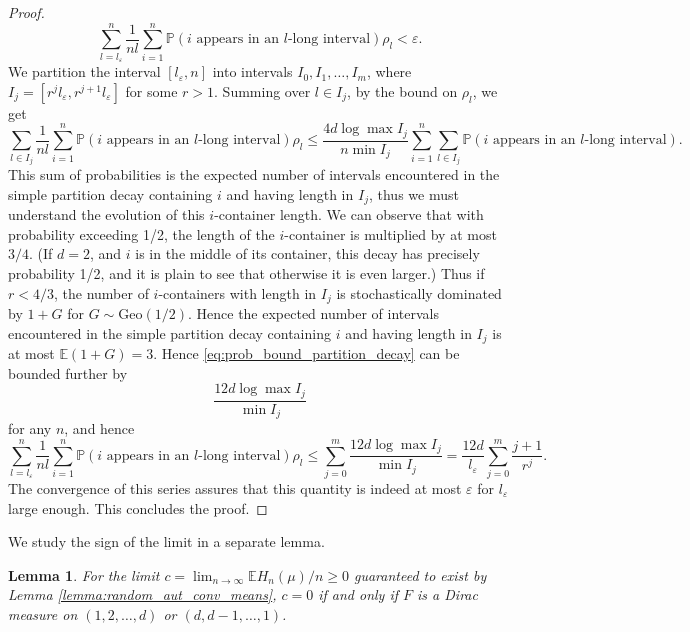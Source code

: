 \documentclass[11pt]{article}
\newcommand{\PP}{\mathbb{P}}
\newcommand{\EE}{\mathbb{E}}
\newtheorem{lemma}[theorem]{Lemma}
\theoremstyle{definition}
\begin{document}
\begin{proof}
    $$\sum_{l=l_\varepsilon}^{n}\frac{1}{nl}\sum_{i=1}^n\PP(\text{$i$ appears in an $l$-long interval})\rho_l<\varepsilon.$$
    We partition the interval $[l_\varepsilon, n]$ into intervals $I_0, I_1, \dots, I_m$, where $I_j =[r^jl_\varepsilon, r^{j+1}l_\varepsilon]$ for some $r>1$. Summing over $l\in I_j$, by the bound on $\rho_l$, we get
    \begin{equation}\label{eq:prob_bound_partition_decay}
    \sum_{l\in I_j}\frac{1}{nl}\sum_{i=1}^n\PP(\text{$i$ appears in an $l$-long interval})\rho_l\leq \frac{4d \log \max I_j}{n \min I_j}\sum_{i=1}^{n}\sum_{l\in I_j}\PP(\text{$i$ appears in an $l$-long interval}).
    \end{equation}
    This sum of probabilities is the expected number of intervals encountered in the simple partition decay containing $i$ and having length in $I_j$, thus we must understand the evolution of this $i$-container length. We can observe that with probability exceeding 1/2, the length of the $i$-container is multiplied by at most $3/4$. (If $d=2$, and $i$ is in the middle of its container, this decay has precisely probability 1/2, and it is plain to see that otherwise it is even larger.) Thus if $r<4/3$, the number of $i$-containers with length in $I_j$ is stochastically dominated by $1+G$ for $G\sim \mathrm{Geo}(1/2)$. Hence the expected number of intervals encountered in the simple partition decay containing $i$ and having length in $I_j$ is at most $\EE(1+G)=3$. Hence \eqref{eq:prob_bound_partition_decay} can be bounded further by
    $$\frac{12d \log \max I_j}{\min I_j}$$
    for any $n$, and hence 
    $$\sum_{l=l_\varepsilon}^{n}\frac{1}{nl}\sum_{i=1}^n\PP(\text{$i$ appears in an $l$-long interval})\rho_l\leq \sum_{j=0}^{m}\frac{12d \log \max I_j}{\min I_j}=\frac{12d}{l_\varepsilon}\sum_{j=0}^{m}\frac{j+1}{r^j}.$$
    The convergence of this series assures that this quantity is indeed at most $\varepsilon$ for $l_{\varepsilon}$ large enough. This concludes the proof.
    \end{proof}

We study the sign of the limit in a separate lemma.

\begin{lemma}\label{lemma:positive_limit}
    For the limit $c=\lim_{n\to\infty}\EE H_n(\mu)/n\geq 0$ guaranteed to exist by Lemma \ref{lemma:random_aut_conv_means}, $c=0$ if and only if $F$ is a Dirac measure on $(1, 2, \dots, d)$ or $(d, d-1, \dots, 1)$.
\end{lemma}
\end{document}
